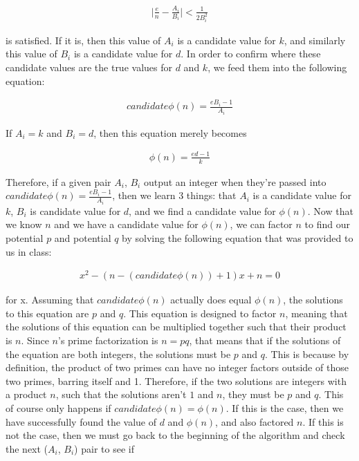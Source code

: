 \documentclass[11pt]{article}
\theoremstyle{definition}
\begin{document}
\begin{enumerate}
\begin{enumerate}
\begin{align*}
    \mid \frac{e}{n} - \frac{A_i}{B_i} \mid < \frac{1}{2B_i^2}
\end{align*}

is satisfied. If it is, then this value of $A_i$ is a candidate value for $k$, and similarly this value of $B_i$ is a candidate value for $d$. In order to confirm where these candidate values are the true values for $d$ and $k$, we feed them into the following equation:

\begin{align*}
    candidate \phi(n) = \frac{eB_i - 1}{A_i}
\end{align*}

If $A_i = k$ and $B_i = d$, then this equation merely becomes

\begin{align*}
    \phi(n) = \frac{ed - 1}{k}
\end{align*}

Therefore, if a given pair $A_i$, $B_i$ output an integer when they're passed into $candidate \phi(n) = \frac{eB_i - 1}{A_i}$, then we learn 3 things: that $A_i$ is a candidate value for $k$, $B_i$ is candidate value for $d$, and we find a candidate value for $\phi(n)$. Now that we know $n$ and we have a candidate value for $\phi(n)$, we can factor $n$ to find our potential $p$ and potential $q$ by solving the following equation that was provided to us in class:

\begin{align*}
    x^2 - (n - (candidate \phi(n)) + 1)x + n = 0
\end{align*}

for x. Assuming that $candidate\phi(n)$ actually does equal $\phi(n)$, the solutions to this equation are $p$ and $q$. This equation is designed to factor $n$, meaning that the solutions of this equation can be multiplied together such that their product is $n$. Since $n$'s prime factorization is $n = pq$, that means that if the solutions of the equation are both integers, the solutions must be $p$ and $q$. This is because by definition, the product of two primes can have no integer factors outside of those two primes, barring itself and 1. Therefore, if the two solutions are integers with a product $n$, such that the solutions aren't $1$ and $n$, they must be $p$ and $q$. This of course only happens if $candidate\phi(n) = \phi(n)$. If this is the case, then we have successfully found the value of $d$ and $\phi(n)$, and also factored $n$. If this is not the case, then we must go back to the beginning of the algorithm and check the next ($A_i$, $B_i$) pair to see if


\end{enumerate}
\end{enumerate}
\end{document}
